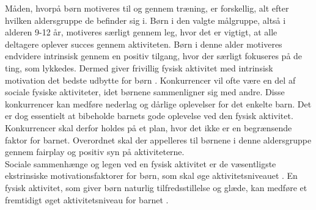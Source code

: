Måden, hvorpå børn motiveres til og gennem træning, er forskellig, alt efter hvilken aldersgruppe de befinder sig i. Børn i den valgte målgruppe, altså i alderen 9-12 år, motiveres særligt gennem leg, hvor det er vigtigt, at alle deltagere oplever succes gennem aktiviteten. Børn i denne alder motiveres endvidere intrinsisk gennem en positiv tilgang, hvor der særligt fokuseres på de ting, som lykkedes. \citep{Wied2011} Dermed giver frivillig fysisk aktivitet med intrinsisk motivation det bedste udbytte for børn \citep{J.Sebire2013}. Konkurrencer vil ofte være en del af sociale fysiske aktiviteter, idet børnene sammenligner sig med andre. Disse konkurrencer kan medføre nederlag og dårlige oplevelser for det enkelte barn. Det er dog essentielt at bibeholde barnets gode oplevelse ved den fysisk aktivitet. Konkurrencer skal derfor holdes på et plan, hvor det ikke er en begrænsende faktor for barnet. Overordnet skal der appelleres til børnene i denne aldersgruppe gennem fairplay og positiv syn på aktiviteterne. \citep{Wied2011}\\
Sociale sammenhænge og legen ved en fysisk aktivitet er de væsentligste ekstrinsiske motivationsfaktorer for børn, som skal øge aktivitetsniveauet \citep{J.Sebire2013,McWhorter2003}. En fysisk aktivitet, som giver børn naturlig tilfredsstillelse og glæde, kan medføre et fremtidigt øget aktivitetsniveau for barnet \citep{Romani2013}.

